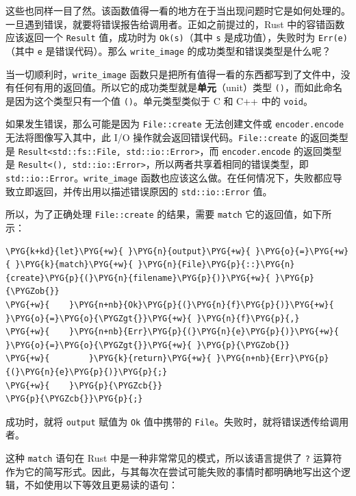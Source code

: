 这些也同样一目了然。该函数值得一看的地方在于当出现问题时它是如何处理的。一旦遇到错误，就要将错误报告给调用者。正如之前提过的，Rust 中的容错函数应该返回一个 \texttt{Result} 值，成功时为 \texttt{Ok(s)}（其中 \texttt{s} 是成功值），失败时为 \texttt{Err(e)}（其中 \texttt{e} 是错误代码）。那么 \texttt{write\_image} 的成功类型和错误类型是什么呢？

当一切顺利时，\texttt{write\_image} 函数只是把所有值得一看的东西都写到了文件中，没有任何有用的返回值。所以它的成功类型就是\textbf{单元}（unit）类型 \texttt{()}，而如此命名是因为这个类型只有一个值 \texttt{()}。单元类型类似于 C 和 C++ 中的 \texttt{void}。

如果发生错误，那么可能是因为 \texttt{File::create} 无法创建文件或 \texttt{encoder.encode} 无法将图像写入其中，此 I/O 操作就会返回错误代码。\texttt{File::create} 的返回类型是 \texttt{Result<std::fs::File, std::io::Error>}，而 \texttt{encoder.encode} 的返回类型是 \texttt{Result<(), std::io::Error>}，所以两者共享着相同的错误类型，即 \texttt{std::io::Error}。\texttt{write\_image} 函数也应该这么做。在任何情况下，失败都应导致立即返回，并传出用以描述错误原因的 \texttt{std::io::Error} 值。

所以，为了正确处理 \texttt{File::create} 的结果，需要 \texttt{match} 它的返回值，如下所示：

\begin{Verbatim}[commandchars=\\\{\},breaklines=true,breakanywhere=true,fontsize=\codefont,xleftmargin=17bp]
\PYG{k+kd}{let}\PYG{+w}{ }\PYG{n}{output}\PYG{+w}{ }\PYG{o}{=}\PYG{+w}{ }\PYG{k}{match}\PYG{+w}{ }\PYG{n}{File}\PYG{p}{::}\PYG{n}{create}\PYG{p}{(}\PYG{n}{filename}\PYG{p}{)}\PYG{+w}{ }\PYG{p}{\PYGZob{}}
\PYG{+w}{    }\PYG{n+nb}{Ok}\PYG{p}{(}\PYG{n}{f}\PYG{p}{)}\PYG{+w}{ }\PYG{o}{=}\PYG{o}{\PYGZgt{}}\PYG{+w}{ }\PYG{n}{f}\PYG{p}{,}
\PYG{+w}{    }\PYG{n+nb}{Err}\PYG{p}{(}\PYG{n}{e}\PYG{p}{)}\PYG{+w}{ }\PYG{o}{=}\PYG{o}{\PYGZgt{}}\PYG{+w}{ }\PYG{p}{\PYGZob{}}
\PYG{+w}{        }\PYG{k}{return}\PYG{+w}{ }\PYG{n+nb}{Err}\PYG{p}{(}\PYG{n}{e}\PYG{p}{)}\PYG{p}{;}
\PYG{+w}{    }\PYG{p}{\PYGZcb{}}
\PYG{p}{\PYGZcb{}}\PYG{p}{;}
\end{Verbatim}

成功时，就将 \texttt{output} 赋值为 \texttt{Ok} 值中携带的 \texttt{File}。失败时，就将错误透传给调用者。

这种 \texttt{match} 语句在 Rust 中是一种非常常见的模式，所以该语言提供了 \texttt{?} 运算符作为它的简写形式。因此，与其每次在尝试可能失败的事情时都明确地写出这个逻辑，不如使用以下等效且更易读的语句：

